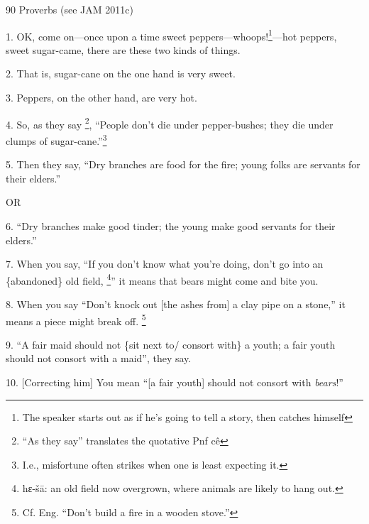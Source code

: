 
90 Proverbs (see JAM 2011c)

1. OK, come on---once upon a time sweet peppers---whoops!\footnote{The speaker starts out as if he's going to tell a story, then catches himself}---hot peppers, sweet
sugar-came, there are these two kinds of things.

2. That is, sugar-cane on the one hand is very sweet.

3. Peppers, on the other hand, are very hot.

4. So, as they say \footnote{``As they say'' translates the quotative Pnf cê}, ``People don't die under pepper-bushes; they die under
clumps of sugar-cane.''\footnote{I.e., misfortune often strikes when one is least expecting it.}

5. Then they say, ``Dry branches are food for the fire; young folks are servants
for their elders.''

OR

6. ``Dry branches make good tinder; the young make good servants for their elders.''

7. When you say, ``If you don't know what you're doing, don't go into an \{abandoned\}
old field, \footnote{hɛ-šā: an old field now overgrown, where animals are likely to hang out.}'' it means that bears might come and bite you.

8. When you say ``Don't knock out [the ashes from] a clay pipe on a stone,'' it
means a piece might break off. \footnote{Cf. Eng. ``Don't build a fire in a wooden stove.''}

9. ``A fair maid should not \{sit next to/ consort with\} a youth; a fair youth
should not consort with a maid'', they say.

10. [Correcting him] You mean ``[a fair youth] should not consort with \textit{bears}!''
